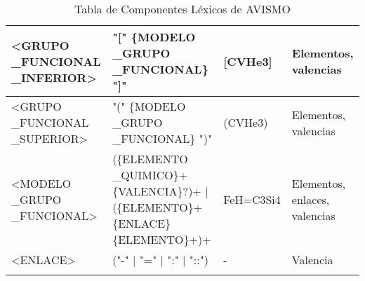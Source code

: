 \begin{landscape}
\begin{longtable}{| p{0.2\textheight} | p{0.75\textheight} | p{0.2\textheight} | p{0.25\textheight} |}
        <GRUPO \_FUNCIONAL \_INFERIOR> & "[" \{MODELO \_GRUPO \_FUNCIONAL\} "]"                                                                                                                                                                                                                                                                                                                                                                                                                                                                                                                       & [CVHe3]       & Elementos, valencias                                                   \\\hline
        <GRUPO \_FUNCIONAL \_SUPERIOR> & "(" \{MODELO \_GRUPO \_FUNCIONAL\} ")"                                                                                                                                                                                                                                                                                                                                                                                                                                                                                                                       & (CVHe3)       & Elementos, valencias                                                   \\\hline
        <MODELO \_GRUPO \_FUNCIONAL>   & (\{ELEMENTO \_QUIMICO\}+ \{VALENCIA\}?)+ | (\{ELEMENTO\}+ \{ENLACE\} \{ELEMENTO\}+)+                                                                                                                                                                                                                                                                                                                                                                                                                                                                         & FeH=C3Si4     & Elementos, enlaces, valencias                                          \\\hline
        <ENLACE>                       & ("-" | "=" | ":" | "::")                                                                                                                                                                                                                                                                                                                                                                                                                                                                                                                                     & -             & Valencia                                                               \\\hline
        \caption{Tabla de Componentes Léxicos de AVISMO}
        \label{table:lexTable}
    \end{longtable}
\end{landscape}

